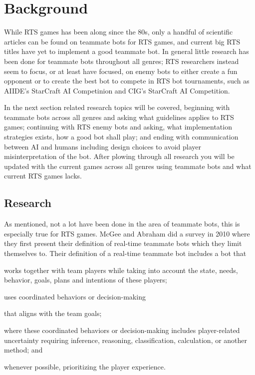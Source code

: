 \chapter{Background}
While RTS games has been along since the 80s\cite{adams06, rtsHistory}, only a handful of scientific articles can be found on teammate bots for RTS games, and current big RTS titles have yet to implement a good teammate bot. In general little research has been done for teammate bots throughout all genres; RTS researchers instead seem to focus, or at least have focused, on enemy bots to either create a fun opponent
or to create the best bot to compete in RTS bot tournaments, such as  AIIDE's StarCraft AI Competinion\cite{scaiide} and CIG's StarCraft AI Competition\cite{sccig}.

In the next section related research topics will be covered, beginning with teammate bots across all genres and asking what guidelines applies to RTS games; continuing with RTS enemy bots and asking, what implementation strategies exists, how a good bot shall play; and ending with communication between AI and humans including design choices to avoid player misinterpretation of the bot. After plowing through all research you will be updated with the current games across all genres using teammate bots and what current RTS games lacks.


\section{Research}
As mentioned, not a lot have been done in the area of teammate bots, this is especially true for RTS games. McGee and Abraham did a survey in 2010 where they first present their definition of real-time teammate bots which they limit themselves to\cite{mcgee10}. Their definition of a real-time teammate bot includes a bot that
\begin{inparaenum}[a\upshape)]
	\item works together with team players while taking into account the state, needs, behavior, goals, plans and intentions of these players;
	\item uses coordinated behaviors or decision-making
	\item that aligns with the team goals;
	\item where these coordinated behaviors or decision-making includes player-related uncertainty requiring inference, reasoning, classification, calculation, or another method; and
	\item whenever possible, prioritizing the player experience.
\end{inparaenum}

